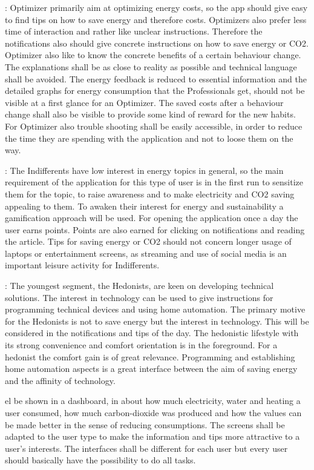 		
	: Optimizer primarily aim at optimizing energy costs, so the app should give easy to find tips on how to save energy and therefore costs. Optimizers also prefer less time of interaction and rather like unclear instructions. Therefore the notifications also should give concrete instructions on how to save energy or CO2. Optimizer also like to know the concrete benefits of a certain behaviour change. The explanations shall be as close to reality as possible and technical language shall be avoided. The energy feedback is reduced to essential information and the detailed graphs for energy consumption that the Professionals get, should not be visible at a first glance for an Optimizer. The saved costs after a behaviour change shall also be visible to provide some kind of reward for the new habits. For Optimizer also trouble shooting shall be easily accessible, in order to reduce the time they are spending with the application and not to loose them on the way.
	

	
	:
	The Indifferents have low interest in energy topics in general, so the main requirement of the application for this type of user is in the first run to sensitize them for the topic, to raise awareness and to make electricity and CO2 saving appealing to them. To awaken their interest for energy and sustainability a gamification approach will be used. For opening the application once a day the user earns points. Points are also earned for clicking on notifications and reading the article. Tips for saving energy or CO2 should not concern longer usage of laptops or entertainment screens, as streaming and use of social media is an important leisure activity for Indifferents.
	

	:
	The youngest segment, the Hedonists, are keen on developing technical solutions. The interest in technology can be used to give instructions for programming technical devices and using home automation. The primary motive for the Hedonists is not to save energy but the interest in technology. This will be considered in the notifications and tips of the day. The hedonistic lifestyle with its strong convenience and comfort orientation is in the foreground. For a hedonist the comfort gain is of great relevance. Programming and establishing home automation aspects is a great interface between the aim of saving energy and the affinity of technology.
	

		el be shown in a dashboard, in about how much electricity, water and heating a user consumed, how much carbon-dioxide was produced and how the values can be made better in the sense of reducing consumptions. The screens shall be adapted to the user type to make the information and tips more attractive to a user's interests. The interfaces shall be different for each user but every user should basically have the possibility to do all tasks.
	
